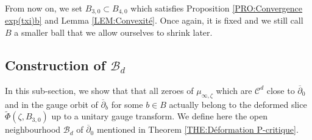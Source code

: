 \documentclass{article}
\theoremstyle{remark}
\theoremstyle{definition}
\newcommand{\mB}{\mathcal{B}}
\newcommand{\mC}{\mathcal{C}}
\newcommand{\dbar}{\overline{\partial}}
\begin{document}
From now on, we set $B_{3,0} \subset B_{4,0}$ which satisfies Proposition \ref{PRO:Convergence exp(txi)b} and Lemma \ref{LEM:Convexité}. Once again, it is fixed and we still call $B$ a smaller ball that we allow ourselves to shrink later.

\subsection{Construction of $\mB_d$}

In this sub-section, we show that that all zeroes of $\mu_{\infty,\zeta}$ which are $\mC^d$ close to $\dbar_0$ and in the gauge orbit of $\dbar_b$ for some $b \in B$ actually belong to the deformed slice $\tilde{\Phi}(\zeta,B_{3,0})$ up to a unitary gauge transform. We define here the open neighbourhood $\mB_d$ of $\dbar_0$ mentioned in Theorem \ref{THE:Déformation P-critique}.
\end{document}
